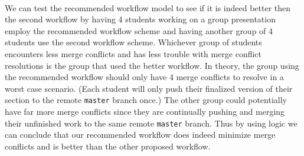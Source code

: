 \documentclass[12pt]{article}
\begin{document}
\paragraph{} We can test the recommended workflow model to see if it is indeed better then the second workflow by  having 4 students working on a group presentation employ the recommended workflow scheme and having another group of 4 students use the second workflow scheme. Whichever group of students encounters less merge conflicts and has less trouble with merge conflict resolutions is the group that used the better workflow. In theory, the group using the recommended workflow should only have 4 merge conflicts to resolve in a worst case scenario. (Each student will only push their finalized version of their section to the remote \texttt{master} branch once.) The other group could potentially have far more merge conflicts since they are continually pushing and merging their unfinished work to the same remote \texttt{master} branch. Thus by using logic we can conclude that our recommended workflow does indeed minimize merge conflicts and is better than the other proposed workflow. 
\end{document}
